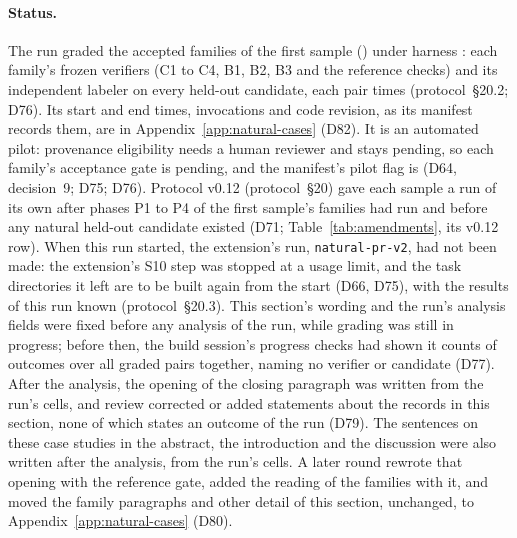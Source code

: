 \paragraph{Status.}
The run \texttt{\NATURALRUN} graded the  accepted families of the first sample () under
harness : each family's frozen verifiers (C1 to C4, B1, B2, B3 and the reference checks) and its
independent labeler on every held-out candidate, each pair  times (protocol~\S20.2; D76). Its start
and end times, invocations and code revision, as its manifest records them, are in Appendix~\ref{app:natural-cases}
(D82). It is an automated
pilot: provenance eligibility needs a human reviewer and stays pending, so each family's acceptance gate is pending, and
the manifest's pilot flag is  (D64, decision~9; D75; D76). Protocol v0.12 (protocol~\S20) gave each
sample a run of its own after phases P1 to P4 of the first sample's families had run and before any natural held-out
candidate existed (D71; Table~\ref{tab:amendments}, its v0.12 row). When this run started, the extension's run,
\texttt{natural-pr-v2}, had not been made: the extension's S10 step was stopped at a usage limit, and the task
directories it left are to be built again from the start (D66, D75), with the results of this run known
(protocol~\S20.3). This section's wording and the run's analysis fields were fixed before any analysis of the run, while
grading was still in progress; before then, the build session's progress checks had shown it counts of outcomes over all
graded pairs together, naming no verifier or candidate (D77). After the analysis, the opening of the closing paragraph
was written from the run's cells, and review corrected or added statements about the records in this section, none of
which states an outcome of the run (D79). The sentences on these case studies in the abstract, the introduction and the
discussion were also written after the analysis, from the run's cells. A later round rewrote that opening with the
reference gate, added the reading of the families with it, and moved the family paragraphs and other detail of this
section, unchanged, to Appendix~\ref{app:natural-cases} (D80).


